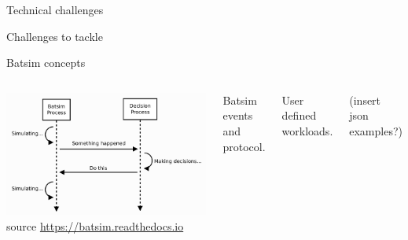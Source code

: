 \documentclass[12pt, aspectratio=43]{beamer}
\begin{document}
\begin{frame}{Technical challenges}
	\begin{alertblock}{Challenges to tackle}
		\begin{enumerate}
		\end{enumerate}
	\end{alertblock}
\end{frame}

\begin{frame}{Batsim concepts}
	\begin{columns}
		\centering
		\includegraphics[width=\textwidth]{../imgs/batsim-sequence-diag.png}
		\tiny{source \url{https://batsim.readthedocs.io}}

		Batsim events and protocol.

		User defined workloads.

		(insert json examples?)
\end{columns}
\end{frame}
\end{document}
